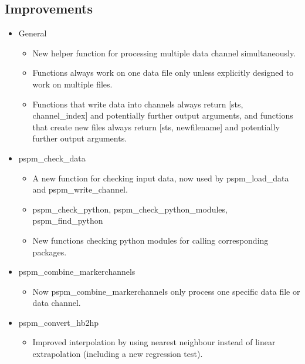 \documentclass[english]{article}
\numberwithin{equation}{section}
\numberwithin{figure}{section}
\begin{document}
\subsection*{Improvements}
\begin{itemize}
\item General

\begin{itemize}
\item New helper function for processing multiple data channel simultaneously.

\item Functions always work on one data file only unless explicitly designed to work on multiple files.

\item Functions that write data into channels always return [sts, channel\_index] and potentially further output arguments, and functions that create new files always return [sts, newfilename] and potentially further output arguments.

\end{itemize}

\item pspm\_check\_data

\begin{itemize}
\item A new function for checking input data, now used by pspm\_load\_data and pspm\_write\_channel.

\item pspm\_check\_python, pspm\_check\_python\_modules, pspm\_find\_python

\item New functions checking python modules for calling corresponding packages.
\end{itemize}

\item pspm\_combine\_markerchannels

\begin{itemize}
\item Now pspm\_combine\_markerchannels only process one specific data file or data channel.
\end{itemize}

\item pspm\_convert\_hb2hp

\begin{itemize}
\item Improved interpolation by using nearest neighbour instead of linear extrapolation (including a new regression test).
\end{itemize}


\end{itemize}
\end{document}
